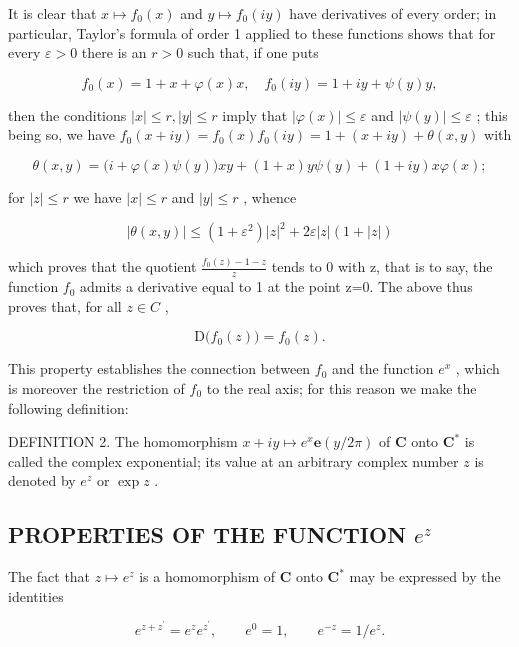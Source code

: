 It is clear that \(x \mapsto f_0(x)\) and \(y \mapsto f_0(iy)\) have derivatives of every order; in particular, Taylor's formula of order 1 applied to these functions shows that for every \(\varepsilon > 0\) there is an \(r > 0\) such that, if one puts

\[
f _ {0} (x) = 1 + x + \varphi (x) x, \quad f _ {0} (i y) = 1 + i y + \psi (y) y,
\]

then the conditions \(|x| \leqslant r, |y| \leqslant r\) imply that \(|\varphi(x)| \leqslant \varepsilon\) and \(|\psi(y)| \leqslant \varepsilon\) ; this being so, we have \(f_0(x + iy) = f_0(x)f_0(iy) = 1 + (x + iy) + \theta(x, y)\) with

\[
\theta (x, y) = \bigl (i + \varphi (x) \psi (y) \bigr) x y + (1 + x) y \psi (y) + (1 + i y) x \varphi (x);
\]

for \(|z| \leqslant r\) we have \(|x| \leqslant r\) and \(|y| \leqslant r\) , whence

\[
\left| \theta (x, y) \right| \leqslant \left(1 + \varepsilon^ {2}\right) | z | ^ {2} + 2 \varepsilon | z | (1 + | z |)
\]

which proves that the quotient \(\frac{f_{0}(z)-1-z}{z}\) tends to 0 with z, that is to say, the function \(f_{0}\) admits a derivative equal to 1 at the point z=0. The above thus proves that, for all \(z\in C\) ,

\[
\mathrm{D} \big (f _ {0} (z) \big) = f _ {0} (z).\tag{21}
\]

This property establishes the connection between \(f_{0}\) and the function \(e^{x}\) , which is moreover the restriction of \(f_{0}\) to the real axis; for this reason we make the following definition:

DEFINITION 2. The homomorphism \(x + iy \mapsto e^x\mathbf{e}(y/2\pi)\) of \(\mathbf{C}\) onto \(\mathbf{C}^*\) is called the complex exponential; its value at an arbitrary complex number \(z\) is denoted by \(e^z\) or \(\exp z\) .

\subsection{\texorpdfstring{PROPERTIES OF THE FUNCTION \(e^{z}\)}{PROPERTIES OF THE FUNCTION E TO THE Z}}

The fact that \(z \mapsto e^z\) is a homomorphism of \(\mathbf{C}\) onto \(\mathbf{C}^*\) may be expressed by the identities

\[
e ^ {z + z ^ {\prime}} = e ^ {z} e ^ {z ^ {\prime}}, \qquad e ^ {0} = 1, \qquad e ^ {- z} = 1 / e ^ {z}.\tag{22}
\]


